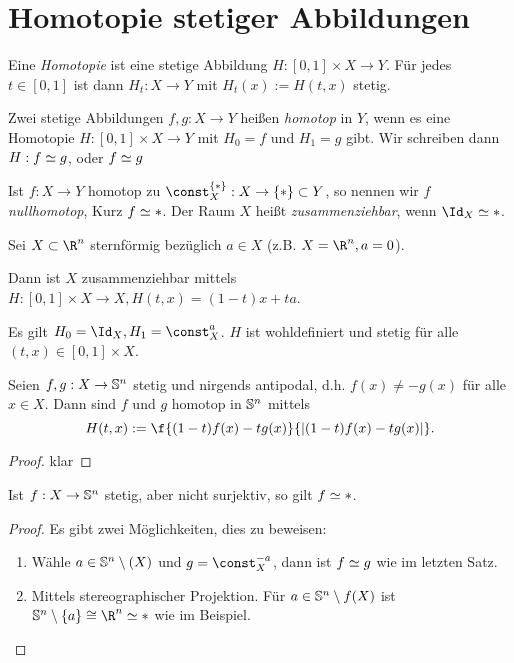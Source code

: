 \section{Homotopie stetiger Abbildungen}


\begin{df}
	Eine \emph{Homotopie} ist eine stetige Abbildung $H: [0,1] \times X \to Y$.
	Für jedes $t \in [0,1]$ ist dann $H_t: X \to Y$ mit $H_t(x) := H(t,x)$ stetig.

	Zwei stetige Abbildungen $f,g : X \to Y$ heißen \emph{homotop} in $Y$, wenn es eine Homotopie $H: [0,1] \times X \to Y$ mit $H_0 = f$ und $H_1 = g$ gibt.
	Wir schreiben dann $H: f \homotopic g$, oder $f\homotopic g$

	Ist $f: X \to  Y$ homotop zu $\const_X^{\{\ast\}}: X \to \{\ast\} \subset Y$, so nennen wir $f$ \emph{nullhomotop}, Kurz $f \homotopic \ast$.
	Der Raum $X$ heißt \emph{zusammenziehbar}, wenn $\Id_X \homotopic \ast$.
\end{df}

\begin{ex}
	Sei $X \subset \R^n$ sternförmig bezüglich $a \in X$ (z.B. $X = \R^n, a = 0$).

	Dann ist $X$ zusammenziehbar mittels $H: [0,1] \times X \to X, H(t,x) = (1-t)x + ta$.

	Es gilt $H_0 = \Id_X, H_1 = \const_X^{a}$.
	$H$ ist wohldefiniert und stetig für alle $(t,x) \in [0,1] \times X$.
\end{ex}

\begin{st}
	Seien $f,g : X \to \S^n$ stetig und nirgends antipodal, d.h. $f(x) \neq -g(x)$ für alle $x \in X$.
	Dann sind $f$ und $g$ homotop in $\S^n$ mittels
	\[
		H(t,x) := \f {(1-t)f(x) - tg(x)}{|(1-t)f(x) - tg(x)|}.
	\]
	\begin{proof}
		klar
	\end{proof}
\end{st}

\begin{kor}
	Ist $f: X \to \S^n$ stetig, aber nicht surjektiv, so gilt $f \homotopic *$.
	\begin{proof}
		Es gibt zwei Möglichkeiten, dies zu beweisen:
		\begin{enumerate}[1.]
			\item
				Wähle $a \in \S^n \setminus (X)$ und $g = \const_X^{-a}$, dann ist $f \homotopic g$ wie im letzten Satz.
			\item
				Mittels stereographischer Projektion.
				Für $a \in \S^n \setminus f(X)$ ist $\S^n \setminus \{a\} \homeomorphic \R^n \homotopic *$ wie im Beispiel.
		\end{enumerate}
	\end{proof}
\end{kor}

